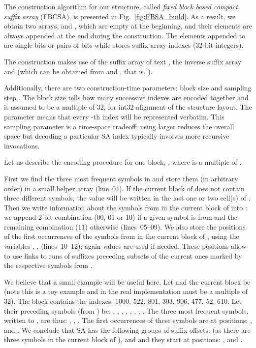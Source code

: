 \documentclass{cai}
\begin{document}
The construction algorithm for our structure, called {\em fixed block based 
compact suffix array} (FBCSA), is presented in Fig.~\ref{fig:FBSA_build}.
As a result, we obtain two arrays,  and , which are empty 
at the beginning, and their elements are always appended at the end 
during the construction.
The elements appended to  are single bits or pairs of bits 
while  stores suffix array indexes (32-bit integers).

The construction makes use of the suffix array  of text ,
the inverse suffix array  and  (which can be obtained 
from  and , that is, ).

Additionally, there are two construction-time parameters: 
block size  and sampling step .
The block size tells how many successive  indexes are encoded together 
and is assumed to be a multiple of 32, for int32 alignment of the structure 
layout.
The parameter  means that every -th  index will be 
represented verbatim.
This sampling parameter is a time-space tradeoff; 
using larger  reduces the overall space but decoding a particular SA index 
typically involves more recursive invocations.

Let us describe the encoding procedure for one block,
, where  is a multiple of .

First we find the three most frequent symbols in  and store them 
(in arbitrary order) in a small helper array  (line~04).
If the current block of  does not contain three different symbols, 
the  value will be written in the last one or two cell(s) of .
Then we write information about the symbols from  in the current block of 
into : we append 2-bit combination (00, 01 or 10) if a given symbol is from  
and the remaining combination (11) otherwise (lines~05--09).
We also store the positions of the first occurrences of the symbols from  
in the current block of , using the variables , ,  
(lines~10--12); 
again  values are used if needed.
These positions allow to use links to runs of suffixes 
preceding subsets of the current ones marked by the respective symbols from .

We believe that a small example will be useful here.
Let  and the current block be  (note this is a toy example 
and in the real implementation  must be a multiple of 32).
The  block contains the indexes: 1000, 522, 801, 303, 906, 477, 52, 610.
Let their preceding symbols (from ) be: , , , , , , , .
The three most frequent symbols, written to , are thus: , , .
The first occurrences of these symbols are at positions: 
,  and . 
We conclude that SA has the following groups of suffix offsets: 
 (as there are three symbols  in the current block of ), 
 and  and they start at positions: 
,  and .
\end{document}
